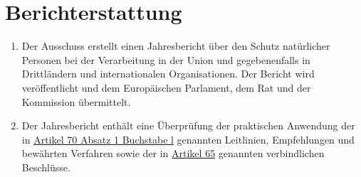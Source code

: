 \chapter{Berichterstattung}
\label{ch:71}


\begin{enumerate}

  \item Der Ausschuss erstellt einen Jahresbericht über den Schutz natürlicher Personen bei der Verarbeitung in der
   Union und gegebenenfalls in Drittländern und internationalen Organisationen. Der Bericht wird veröffentlicht und dem
   Europäischen Parlament, dem Rat und der Kommission übermittelt.
  \label{itm:71-1}

  \item Der Jahresbericht enthält eine Überprüfung der praktischen Anwendung der in \hyperref[itm:70-1l]{Artikel 70
   Absatz 1 Buchstabe l} genannten Leitlinien, Empfehlungen und bewährten Verfahren sowie der in \hyperref[ch:65]
   {Artikel 65} genannten verbindlichen Beschlüsse.
  \label{itm:71-2}

\end{enumerate}


